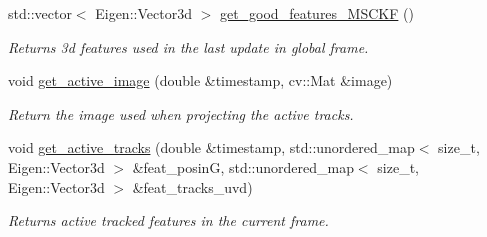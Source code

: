 \begin{DoxyCompactItemize}
\mbox{\label{classov__msckf_1_1VioManager_a6f44315b0084e276598d4ce508574e4b}} 
std\+::vector$<$ Eigen\+::\+Vector3d $>$ \hyperlink{classov__msckf_1_1VioManager_a6f44315b0084e276598d4ce508574e4b}{get\+\_\+good\+\_\+features\+\_\+\+M\+S\+C\+KF} ()
\begin{DoxyCompactList}\small\item\em Returns 3d features used in the last update in global frame. \end{DoxyCompactList}\item 
\mbox{\label{classov__msckf_1_1VioManager_a6f73eaacca9a468e02d6322e0987c480}} 
void \hyperlink{classov__msckf_1_1VioManager_a6f73eaacca9a468e02d6322e0987c480}{get\+\_\+active\+\_\+image} (double \&timestamp, cv\+::\+Mat \&image)
\begin{DoxyCompactList}\small\item\em Return the image used when projecting the active tracks. \end{DoxyCompactList}\item 
\mbox{\label{classov__msckf_1_1VioManager_a2645f06f1516cec870e6d69f2baa66ba}} 
void \hyperlink{classov__msckf_1_1VioManager_a2645f06f1516cec870e6d69f2baa66ba}{get\+\_\+active\+\_\+tracks} (double \&timestamp, std\+::unordered\+\_\+map$<$ size\+\_\+t, Eigen\+::\+Vector3d $>$ \&feat\+\_\+posinG, std\+::unordered\+\_\+map$<$ size\+\_\+t, Eigen\+::\+Vector3d $>$ \&feat\+\_\+tracks\+\_\+uvd)
\begin{DoxyCompactList}\small\item\em Returns active tracked features in the current frame. \end{DoxyCompactList}\end{DoxyCompactItemize}
